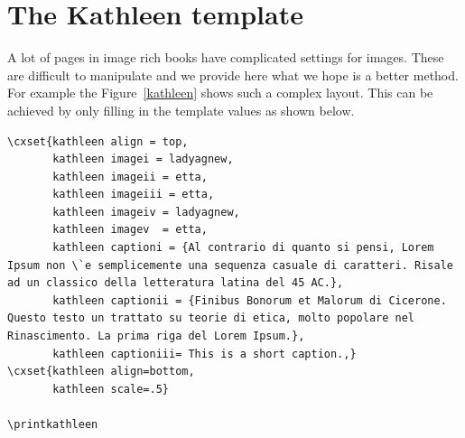 



\begin{center}\printkathleen\par\label{kathleen}\end{center}

\newpage

\section{The Kathleen template} 

A lot of pages in image rich books have complicated settings for images.
These are difficult to manipulate and we provide here what we hope is
a better method. For example the Figure~\ref{kathleen} shows such a complex layout. This can be achieved by only filling in the template
values as shown below.

\begin{tcolorbox}
\begin{lstlisting}
\cxset{kathleen align = top,
       kathleen imagei = ladyagnew,
       kathleen imageii = etta,
       kathleen imageiii = etta,
       kathleen imageiv = ladyagnew,
       kathleen imagev  = etta,
       kathleen captioni = {Al contrario di quanto si pensi, Lorem Ipsum non \`e semplicemente una sequenza casuale di caratteri. Risale ad un classico della letteratura latina del 45 AC.}, 
       kathleen captionii = {Finibus Bonorum et Malorum di Cicerone. Questo testo un trattato su teorie di etica, molto popolare nel Rinascimento. La prima riga del Lorem Ipsum.},
       kathleen captioniii= This is a short caption.,} 
\cxset{kathleen align=bottom,
       kathleen scale=.5}

\printkathleen

\end{lstlisting}
\end{tcolorbox}



\clearpage


\parindent0pt
\pagestyle{empty}


